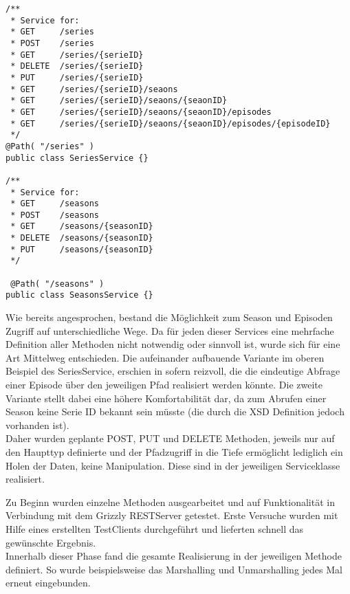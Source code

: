 \begin{lstlisting}[label=seriesseasonsservices,caption= Klassenaufbau von BeispielServices]
/**
 * Service for:
 * GET     /series
 * POST    /series
 * GET     /series/{serieID}
 * DELETE  /series/{serieID}
 * PUT     /series/{serieID}
 * GET     /series/{serieID}/seaons
 * GET     /series/{serieID}/seaons/{seaonID}
 * GET     /series/{serieID}/seaons/{seaonID}/episodes
 * GET     /series/{serieID}/seaons/{seaonID}/episodes/{episodeID}
 */
@Path( "/series" )
public class SeriesService {}

/**
 * Service for:
 * GET     /seasons
 * POST    /seasons
 * GET     /seasons/{seasonID}
 * DELETE  /seasons/{seasonID}
 * PUT     /seasons/{seasonID}
 */

 @Path( "/seasons" )
public class SeasonsService {}

\end{lstlisting}
Wie bereits angesprochen, bestand die Möglichkeit zum Season und Episoden Zugriff auf unterschiedliche Wege. Da für jeden dieser Services eine mehrfache Definition aller Methoden nicht notwendig oder sinnvoll ist, wurde sich für eine Art Mittelweg entschieden. Die aufeinander aufbauende Variante im oberen Beispiel des SeriesService, erschien in sofern reizvoll, die die eindeutige Abfrage einer Episode über den jeweiligen Pfad realisiert werden könnte. Die zweite Variante stellt dabei eine höhere Komfortabilität dar, da zum Abrufen einer Season keine Serie ID bekannt sein müsste (die durch die XSD Definition jedoch vorhanden ist).\\
Daher wurden geplante POST, PUT und DELETE Methoden, jeweils nur auf den Haupttyp definierte und der Pfadzugriff in die Tiefe ermöglicht lediglich ein Holen der Daten, keine Manipulation. Diese sind in der jeweiligen Serviceklasse realisiert.

\vspace{0.2cm}

Zu Beginn wurden einzelne Methoden ausgearbeitet und auf Funktionalität in Verbindung mit dem Grizzly RESTServer getestet. Erste Versuche wurden mit Hilfe eines erstellten TestClients durchgeführt und lieferten schnell das gewünschte Ergebnis.\\
Innerhalb dieser Phase fand  die gesamte Realisierung in der jeweiligen Methode definiert. So wurde beispielsweise das Marshalling und Unmarshalling jedes Mal erneut eingebunden.

